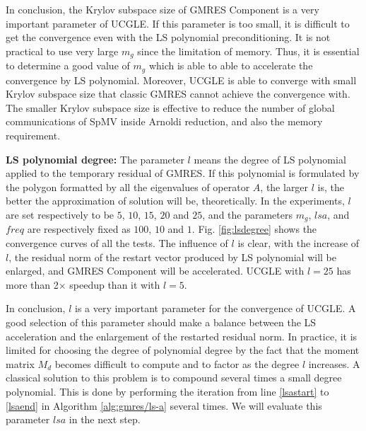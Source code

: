 In conclusion, the Krylov subspace size of GMRES Component is a very important parameter of UCGLE. If this parameter is too small, it is difficult to get the convergence even with the LS polynomial preconditioning. It is not practical to use very large $m_g$ since the limitation of memory. Thus, it is essential to determine a good value of $m_g$ which is able to able to accelerate the convergence by LS polynomial. Moreover, UCGLE is able to converge with small Krylov subspace size that  classic GMRES cannot achieve the convergence with. The smaller Krylov subspace size is effective to reduce the number of global communications of SpMV inside Arnoldi reduction, and also the memory requirement.

\textbf{LS polynomial degree: }The parameter $l$  means the degree of  LS polynomial applied to the temporary residual of GMRES. If this polynomial is formulated by the polygon formatted by all the eigenvalues of operator $A$, the larger $l$ is, the better the approximation of solution will be, theoretically. In the experiments, $l$ are set respectively to be $5$, $10$, $15$, $20$ and $25$, and the parameters $m_g$, $lsa$, and $freq$ are respectively fixed as $100$, $10$ and $1$. Fig. \ref{fig:lsdegree} shows the convergence curves of all the tests. The influence of $l$ is clear, with the increase of $l$, the residual norm of the restart vector produced by LS polynomial will be enlarged, and GMRES Component will be accelerated. UCGLE with $l=25$ has more than 2$\times$ speedup than it with $l=5$.

In conclusion, $l$ is a very important parameter for the convergence of UCGLE. A good selection of this parameter should make a balance between the LS acceleration and the enlargement of the restarted residual norm. In practice, it is limited for choosing the degree of polynomial degree by the fact that the moment matrix $M_d$ becomes difficult to compute and to factor as the degree $l$ increases. A classical solution to this problem is to compound several times a small degree polynomial. This is done by performing the iteration from line \ref{lsastart} to \ref{lsaend} in Algorithm \ref{alg:gmres/ls-a} several times. We will evaluate this parameter $lsa$ in the next step.


